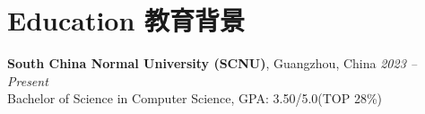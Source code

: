 \section*{ Education 教育背景}

\textbf{South China Normal University (SCNU)}, Guangzhou, China \hfill \textit{2023 – Present} \\
Bachelor of Science in Computer Science, GPA: 3.50/5.0(TOP 28\%)
